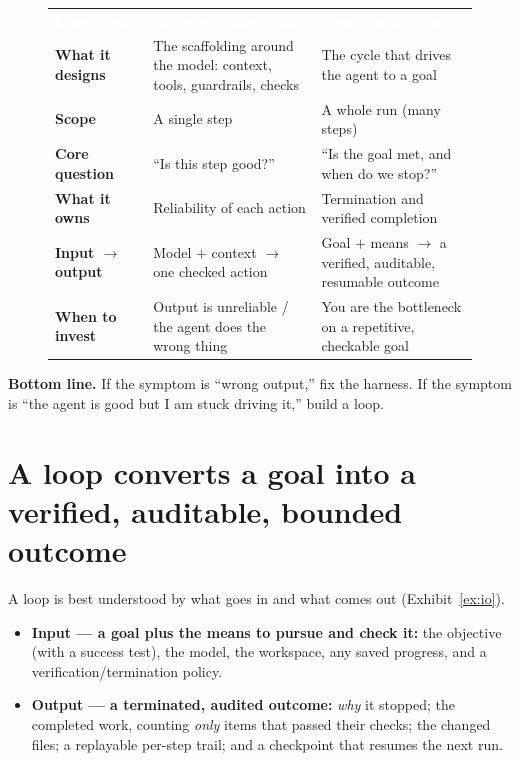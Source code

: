 \documentclass[11pt]{article}
\newcommand{\sotag}[1]{\textcolor{mckblue}{\textbf{#1}}}
\begin{document}
\begin{figure}[t]
\small
\renewcommand{\arraystretch}{1.35}
\begin{tabularx}{\textwidth}{@{}>{\bfseries\color{mckdeep}}p{} >{\raggedright\arraybackslash}X >{\raggedright\arraybackslash}X@{}}
\rowcolor{mckdeep}
\textcolor{white}{Dimension} & \textcolor{white}{\textbf{Harness engineering}} & \textcolor{white}{\textbf{Loop engineering}} \\
What it designs & The scaffolding around the model: context, tools, guardrails, checks & The cycle that drives the agent to a goal \\
Scope          & A single step                                   & A whole run (many steps) \\
Core question  & ``Is this step good?''                          & ``Is the goal met, and when do we stop?'' \\
What it owns   & Reliability of each action                      & Termination and verified completion \\
Input $\rightarrow$ output & Model $+$ context $\rightarrow$ one checked action & Goal $+$ means $\rightarrow$ a verified, auditable, resumable outcome \\
When to invest & Output is unreliable / the agent does the wrong thing & You are the bottleneck on a repetitive, checkable goal \\
\end{tabularx}
\label{ex:compare}
\end{figure}

\begin{bottomline}
\textbf{Bottom line.} If the symptom is ``wrong output,'' fix the harness. If the
symptom is ``the agent is good but I am stuck driving it,'' build a loop.
\end{bottomline}

\section{A loop converts a goal into a verified, auditable, bounded outcome}
A loop is best understood by what goes in and what comes out
(Exhibit~\ref{ex:io}).

\begin{itemize}
\item \sotag{Input --- a goal plus the means to pursue and check it:} the
objective (with a success test), the model, the workspace, any saved progress,
and a verification/termination policy.
\item \sotag{Output --- a terminated, audited outcome:} \emph{why} it stopped;
the completed work, counting \emph{only} items that passed their checks; the
changed files; a replayable per-step trail; and a checkpoint that resumes the
next run.
\end{itemize}
\end{document}
